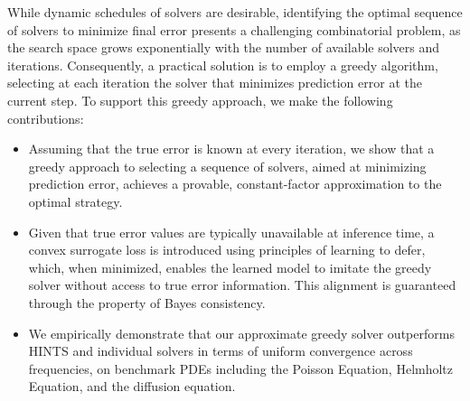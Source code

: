 \documentclass{article} %
\begin{document}

While dynamic schedules of solvers are desirable, identifying the optimal sequence of solvers to minimize final error presents a challenging combinatorial problem, as the search space grows exponentially with the number of available solvers and iterations. Consequently, a practical solution is to employ a greedy algorithm, selecting at each iteration the solver that minimizes prediction error at the current step. To support this greedy approach, we make the following contributions:
\begin{itemize}
    \item Assuming that the true error is known at every iteration, we show that a greedy approach to selecting a sequence of solvers, aimed at minimizing prediction error, achieves a provable, constant-factor approximation to the optimal strategy.
    \item  Given that true error values are typically unavailable at inference time, a convex surrogate loss is introduced using principles of learning to defer, which, when minimized, enables the learned model to imitate the greedy solver without access to true error information. This alignment is guaranteed through the property of Bayes consistency.
    \item We empirically demonstrate that our approximate greedy solver outperforms HINTS and individual solvers in terms of uniform convergence across frequencies, on benchmark PDEs including the Poisson Equation, Helmholtz Equation, and the diffusion equation.
\end{itemize}

\end{document}
